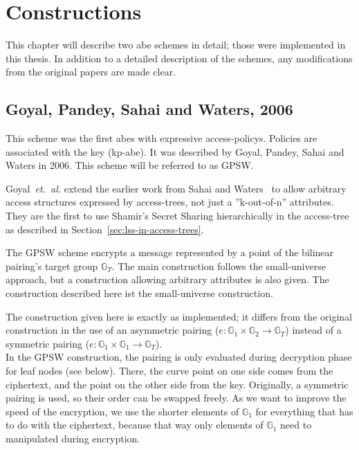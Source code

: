 \chapter{Constructions}\label{chapter:constructions} 

This chapter will describe two \acrshort{abe} schemes in detail; those were implemented in this thesis.
In addition to a detailed description of the schemes, any modifications from the original papers are made clear.

\section{Goyal, Pandey, Sahai and Waters, 2006}
This scheme was the first \acrshort{abes} with expressive \glspl{access-policy}. Policies are associated with the key (\acrshort{kp-abe}).
It was described by Goyal, Pandey, Sahai and Waters \cite{goyal_attribute-based_2006} in 2006. This scheme will be referred to as GPSW.

Goyal~\emph{et.~al.} extend the earlier work from Sahai and Waters~\cite{sahai_fuzzy_2005} to allow arbitrary access structures expressed by \glspl{access-tree}, not just a ''k-out-of-n'' attributes.
They are the first to use Shamir's Secret Sharing hierarchically in the \gls{access-tree} as described in Section~\ref{sec:lss-in-access-trees}. 

The GPSW scheme encrypts a message represented by a point of the bilinear pairing's target group $\mathbb{G}_T$.
The main construction follows the \gls{small-universe} approach, but a construction allowing arbitrary attributes is also given.
The construction described here ist the \gls{small-universe} construction.

The construction given here is exactly as implemented; it differs from the original construction in the use of an asymmetric pairing ($e: \mathbb{G}_1 \times \mathbb{G}_2 \rightarrow \mathbb{G}_T$) instead of a symmetric pairing ($e: \mathbb{G}_1 \times \mathbb{G}_1 \rightarrow \mathbb{G}_T$).\\
In the GPSW construction, the pairing is only evaluated during decryption phase for leaf nodes (see below).
There, the curve point on one side comes from the ciphertext, and the point on the other side from the key.
Originally, a symmetric pairing is used, so their order can be swapped freely.
As we want to improve the speed of the encryption, we use the shorter elements of $\mathbb{G}_1$ for everything that has to do with the ciphertext, because that way only elements of $\mathbb{G}_1$ need to manipulated during encryption.

